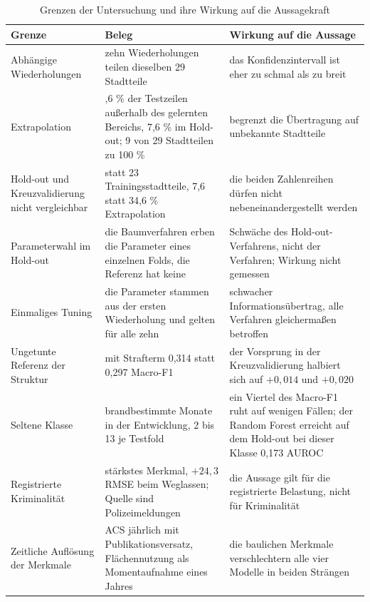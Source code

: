\begin{table}[H]
\centering
\caption{Grenzen der Untersuchung und ihre Wirkung auf die Aussagekraft}
\label{tab:limitationen}
\footnotesize
\singlespacing
\setlength{\tabcolsep}{4pt}
\begin{tabularx}{\textwidth}{@{}>{\raggedright\arraybackslash}p{3.1cm} >{\raggedright\arraybackslash}p{4.4cm} >{\raggedright\arraybackslash}X@{}}
\toprule
\textbf{Grenze} & \textbf{Beleg} & \textbf{Wirkung auf die Aussage} \\
\midrule
Abhängige Wiederholungen & zehn Wiederholungen teilen dieselben 29 Stadtteile & das Konfidenzintervall ist eher zu schmal als zu breit \\
\addlinespace
Extrapolation & 34,6 \% der Testzeilen außerhalb des gelernten Bereichs, 7,6 \% im Hold-out; 9 von 29 Stadtteilen zu 100 \% & begrenzt die Übertragung auf unbekannte Stadtteile \\
\addlinespace
Hold-out und Kreuzvalidierung nicht vergleichbar & 29 statt 23 Trainingsstadtteile, 7,6 statt 34,6 \% Extrapolation & die beiden Zahlenreihen dürfen nicht nebeneinandergestellt werden \\
\addlinespace
Parameterwahl im Hold-out & die Baumverfahren erben die Parameter eines einzelnen Folds, die Referenz hat keine & Schwäche des Hold-out-Verfahrens, nicht der Verfahren; Wirkung nicht gemessen \\
\addlinespace
Einmaliges Tuning & die Parameter stammen aus der ersten Wiederholung und gelten für alle zehn & schwacher Informationsübertrag, alle Verfahren gleichermaßen betroffen \\
\addlinespace
Ungetunte Referenz der Struktur & mit Strafterm 0,314 statt 0,297 Macro-F1 & der Vorsprung in der Kreuzvalidierung halbiert sich auf $+0{,}014$ und $+0{,}020$ \\
\addlinespace
Seltene Klasse & 33 brandbestimmte Monate in der Entwicklung, 2 bis 13 je Testfold & ein Viertel des Macro-F1 ruht auf wenigen Fällen; der Random Forest erreicht auf dem Hold-out bei dieser Klasse 0,173 AUROC \\
\addlinespace
Registrierte Kriminalität & stärkstes Merkmal, $+24{,}3$ RMSE beim Weglassen; Quelle sind Polizeimeldungen & die Aussage gilt für die registrierte Belastung, nicht für Kriminalität \\
\addlinespace
Zeitliche Auflösung der Merkmale & ACS jährlich mit Publikationsversatz, Flächennutzung als Momentaufnahme eines Jahres & die baulichen Merkmale verschlechtern alle vier Modelle in beiden Strängen \\

\end{tabularx}
\end{table}
